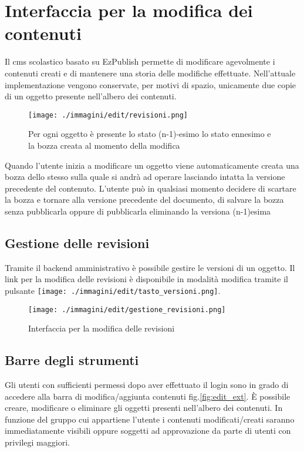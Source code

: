 \chapter[Interfaccia modifica]{Interfaccia per la modifica dei contenuti}


Il cms scolastico basato su EzPublish permette di modificare agevolmente i contenuti creati e di mantenere una storia delle modifiche effettuate. Nell'attuale implementazione vengono conservate, per motivi di spazio, unicamente due copie di un oggetto presente nell'albero dei contenuti.
\begin{figure}[H]
 \centering
 \texttt{[image: ./immagini/edit/revisioni.png]}
 \caption{Per ogni oggetto è presente lo stato (n-1)-esimo lo stato ennesimo e la bozza creata al momento della modifica}
 \label{fig:revisioni}
\end{figure}

Quando l'utente inizia a modificare un oggetto viene automaticamente creata una bozza dello stesso sulla quale si andrà ad operare lasciando intatta la versione precedente del contenuto. L'utente può in qualsiasi momento decidere di scartare la bozza e tornare alla versione precedente del documento, di salvare la bozza senza pubblicarla oppure di pubblicarla eliminando la versiona (n-1)esima 
\section{Gestione delle revisioni}
Tramite il backend amministrativo è possibile gestire le versioni di un oggetto. Il link per la modifica delle revisioni è disponibile in modalità modifica tramite il pulsante \texttt{[image: ./immagini/edit/tasto\_versioni.png]}.
\begin{figure}[H]
 \centering
 \texttt{[image: ./immagini/edit/gestione\_revisioni.png]}
 \caption{Interfaccia per la modifica delle revisioni}
 \label{fig:gestione_revisioni}
\end{figure}


\section{Barre degli strumenti}

Gli utenti con sufficienti permessi dopo aver effettuato il login sono in grado di accedere alla barra di modifica/aggiunta contenuti fig.\ref{fig:edit_ext}. È possibile creare, modificare o eliminare gli oggetti presenti nell'albero dei contenuti. In funzione del gruppo cui appartiene l'utente i contenuti modificati/creati saranno immediatamente visibili oppure soggetti ad approvazione da parte di utenti con privilegi maggiori.

